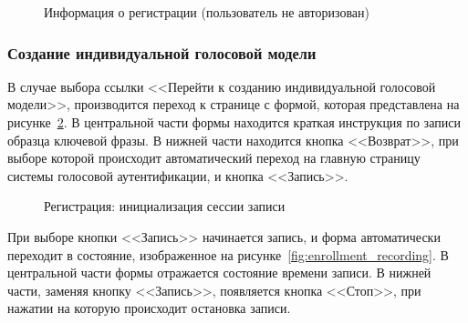 \begin{figure}[hbt!]
\caption{Информация о регистрации (пользователь не авторизован)}
\label{fig:enrollment_initial_anonymous}
\end{figure}

\subsubsection{Создание индивидуальной голосовой модели}
\label{sec:manual:enrollment}

В случае выбора ссылки <<Перейти к созданию индивидуальной голосовой модели>>,
производится переход к странице с формой, которая представлена на
рисунке~\ref{fig:enrollment_created}. В центральной части формы находится
краткая инструкция по записи образца ключевой фразы. В нижней части находится
кнопка <<Возврат>>, при выборе которой происходит автоматический переход на
главную страницу системы голосовой аутентификации, и кнопка <<Запись>>.


\begin{figure}[hbt!]
\caption{Регистрация: инициализация сессии записи}
\label{fig:enrollment_created}
\end{figure}

При выборе кнопки <<Запись>> начинается запись, и форма  автоматически переходит
в состояние, изображенное на рисунке~\ref{fig:enrollment_recording}. В
центральной части формы отражается состояние времени записи. В нижней части,
заменяя кнопку <<Запись>>, появляется кнопка <<Стоп>>, при нажатии на которую
происходит остановка записи.


